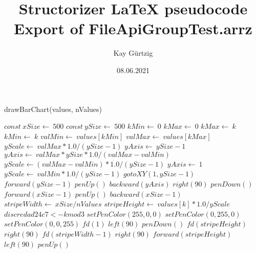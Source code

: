 \documentclass[a4paper,10pt]{article}
\title{Structorizer LaTeX pseudocode Export of FileApiGroupTest.arrz}
\author{Kay Gürtzig}
\date{08.06.2021}
\begin{document}
\begin{algorithm}
\caption{drawBarChart(values, nValues)}
\begin{algorithmic}[5]

\STATE {}
\STATE {}
\STATE {}
\STATE {}
  \STATE \(const\ xSize\gets\ 500\)
  \STATE \(const\ ySize\gets\ 500\)
  \STATE \(kMin\gets\ 0\)
  \STATE \(kMax\gets\ 0\)
      \STATE \(kMax\gets\ k\)
    \ELSE
        \STATE \(kMin\gets\ k\)
      \ENDIF
    \ENDIF
  \ENDFOR
  \STATE \(valMin\gets\ values[kMin]\)
  \STATE \(valMax\gets\ values[kMax]\)
  \STATE \(yScale\gets\ valMax*1.0/(ySize-1)\)
  \STATE \(yAxis\gets\ ySize-1\)
      \STATE \(yAxis\gets\ valMax*ySize*1.0/(valMax-valMin)\)
      \STATE \(yScale\gets(valMax-valMin)*1.0/(ySize-1)\)
    \ELSE
      \STATE \(yAxis\gets\ 1\)
      \STATE \(yScale\gets\ valMin*1.0/(ySize-1)\)
    \ENDIF
  \ENDIF
  \STATE \(gotoXY(1,ySize-1)\)
  \STATE \(forward(ySize-1)\)
  \STATE \(penUp()\)
  \STATE \(backward(yAxis)\)
  \STATE \(right(90)\)
  \STATE \(penDown()\)
  \STATE \(forward(xSize-1)\)
  \STATE \(penUp()\)
  \STATE \(backward(xSize-1)\)
  \STATE \(stripeWidth\gets\ xSize/nValues\)
    \STATE \(stripeHeight\gets\ values[k]*1.0/yScale\)
    \STATE \(discredad24c7 <- k mod 3\)
      \STATE \(setPenColor(255,0,0)\)
      \STATE \(setPenColor(0,255,0)\)
      \STATE \(setPenColor(0,0,255)\)
    \ENDIF
    \STATE \(fd(1)\)
    \STATE \(left(90)\)
    \STATE \(penDown()\)
    \STATE \(fd(stripeHeight)\)
    \STATE \(right(90)\)
    \STATE \(fd(stripeWidth-1)\)
    \STATE \(right(90)\)
    \STATE \(forward(stripeHeight)\)
    \STATE \(left(90)\)
    \STATE \(penUp()\)
  \ENDFOR

\end{algorithmic}
\end{algorithm}
\end{document}
